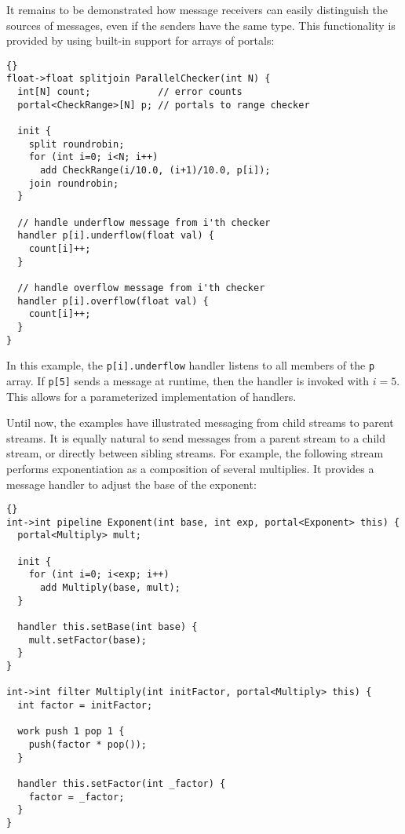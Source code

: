 It remains to be demonstrated how message receivers can easily
distinguish the sources of messages, even if the senders have the same
type.  This functionality is provided by using built-in support for
arrays of portals:


\begin{lstlisting}{}
float->float splitjoin ParallelChecker(int N) {
  int[N] count;            // error counts
  portal<CheckRange>[N] p; // portals to range checker

  init {
    split roundrobin;
    for (int i=0; i<N; i++)
      add CheckRange(i/10.0, (i+1)/10.0, p[i]);
    join roundrobin;
  }

  // handle underflow message from i'th checker
  handler p[i].underflow(float val) {
    count[i]++;
  }

  // handle overflow message from i'th checker
  handler p[i].overflow(float val) {
    count[i]++;
  }
}
\end{lstlisting}{}

In this example, the \lstinline|p[i].underflow| handler listens to all
members of the \lstinline|p| array.  If \lstinline|p[5]| sends a
message at runtime, then the handler is invoked with $i=5$.  This
allows for a parameterized implementation of handlers.

Until now, the examples have illustrated messaging from child streams
to parent streams.  It is equally natural to send messages from a
parent stream to a child stream, or directly between sibling streams.
For example, the following stream performs exponentiation as a
composition of several multiplies.  It provides a message handler to
adjust the base of the exponent:

\begin{lstlisting}{}
int->int pipeline Exponent(int base, int exp, portal<Exponent> this) {
  portal<Multiply> mult;

  init {
    for (int i=0; i<exp; i++)
      add Multiply(base, mult);
  }

  handler this.setBase(int base) {
    mult.setFactor(base);
  }
}

int->int filter Multiply(int initFactor, portal<Multiply> this) {
  int factor = initFactor;

  work push 1 pop 1 {
    push(factor * pop());
  }

  handler this.setFactor(int _factor) {
    factor = _factor;
  }
}
\end{lstlisting}{}

